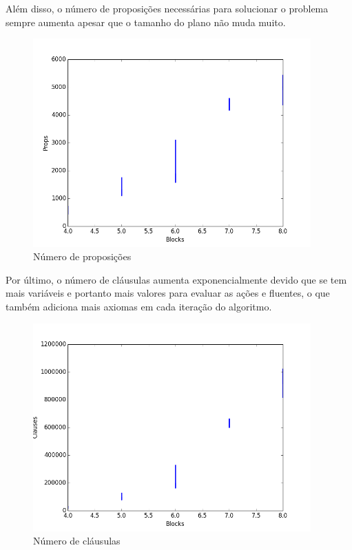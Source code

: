 	Além disso, o número de proposições necessárias para solucionar o problema sempre aumenta apesar que o tamanho do plano não muda muito.
		\begin{figure}[H]
			\centering
			\includegraphics[height=8cm]{images/blocks-props}
			\caption{Número de proposições}
			\label{fig:blocksprops}
		\end{figure}
	Por último, o número de cláusulas aumenta exponencialmente devido que se tem mais variáveis e portanto mais valores para evaluar as ações e fluentes, o que também adiciona mais axiomas em cada iteração do algoritmo. 
		\begin{figure}[H]
			\centering
			\includegraphics[height=8cm]{images/blocks-clauses}
			\caption{Número de cláusulas}
			\label{fig:blocksclauses}
		\end{figure}
		
